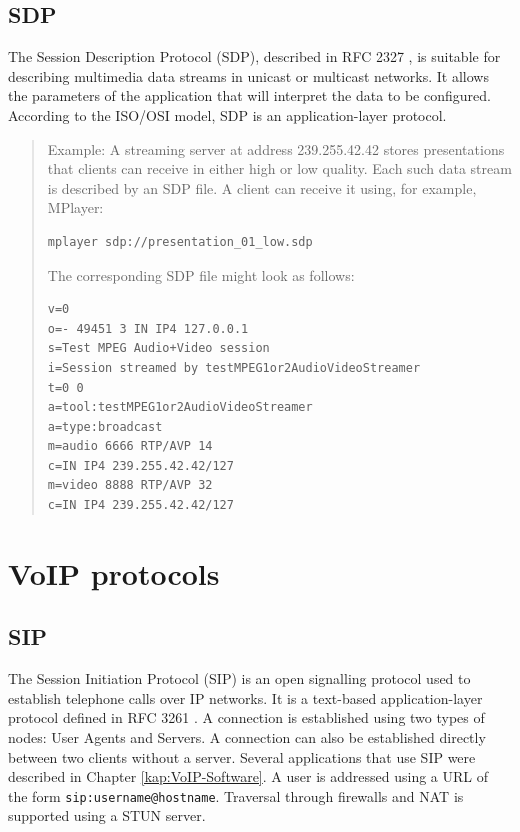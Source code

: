 \subsection{SDP}\label{kap:SDP}
The Session Description Protocol (SDP), described in RFC 2327 \cite{RFC-2327-SDP-Protocol}, is suitable for describing multimedia data streams in unicast or multicast networks. It allows the parameters of the application that will interpret the data to be configured. According to the ISO/OSI model, SDP is an application-layer protocol.

\begin{quote}
Example: A streaming server at address 239.255.42.42 stores presentations that clients can receive in either high or low quality. Each such data stream is described by an SDP file.
A client can receive it using, for example, MPlayer:
\begin{verbatim}
mplayer sdp://presentation_01_low.sdp
\end{verbatim}

The corresponding SDP file might look as follows:
\begin{verbatim}
v=0
o=- 49451 3 IN IP4 127.0.0.1
s=Test MPEG Audio+Video session
i=Session streamed by testMPEG1or2AudioVideoStreamer
t=0 0
a=tool:testMPEG1or2AudioVideoStreamer
a=type:broadcast
m=audio 6666 RTP/AVP 14
c=IN IP4 239.255.42.42/127
m=video 8888 RTP/AVP 32
c=IN IP4 239.255.42.42/127
\end{verbatim}
\end{quote}

\section{VoIP protocols}\label{kap:VoIP-Protocols}

\subsection{SIP}
The Session Initiation Protocol (SIP) is an open signalling protocol used to establish telephone calls over IP networks. It is a text-based application-layer protocol defined in RFC 3261 \cite{RFC-3261-SIP-Protocol}. A connection is established using two types of nodes: User Agents and Servers. A connection can also be established directly between two clients without a server. Several applications that use SIP were described in Chapter \ref{kap:VoIP-Software}. A user is addressed using a URL of the form \texttt{sip:username@hostname}. Traversal through firewalls and NAT is supported using a STUN server.

